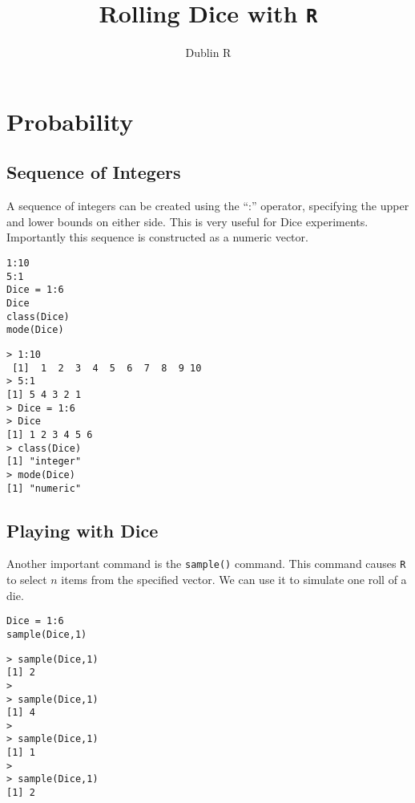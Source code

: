 \documentclass[11pt]{article} %
\title{Rolling Dice with \texttt{R}}
\author{Dublin R}
\begin{document}
\maketitle

\section{Probability}
\subsection{Sequence of Integers}
A sequence of integers can be created using the “:” operator, specifying the upper and lower bounds on either side. This is very useful for Dice experiments. Importantly this sequence is constructed as a numeric vector.
\begin{framed}
\begin{verbatim}
1:10
5:1
Dice = 1:6
Dice
class(Dice)
mode(Dice)
\end{verbatim}
\end{framed}

\begin{verbatim}
> 1:10
 [1]  1  2  3  4  5  6  7  8  9 10
> 5:1
[1] 5 4 3 2 1
> Dice = 1:6
> Dice
[1] 1 2 3 4 5 6
> class(Dice)
[1] "integer"
> mode(Dice)
[1] "numeric"
\end{verbatim}

\subsection{Playing with Dice}


Another important command is the \texttt{sample()} command. This command causes \texttt{R} to select $n$ items from the specified vector. We can use it to simulate one roll of a die.
\begin{framed}
\begin{verbatim}
Dice = 1:6
sample(Dice,1)
\end{verbatim}
\end{framed}
\begin{verbatim}
> sample(Dice,1)
[1] 2 
> 
> sample(Dice,1)
[1] 4 
>
> sample(Dice,1)
[1] 1
> 
> sample(Dice,1)
[1] 2
\end{verbatim}

\end{document}
